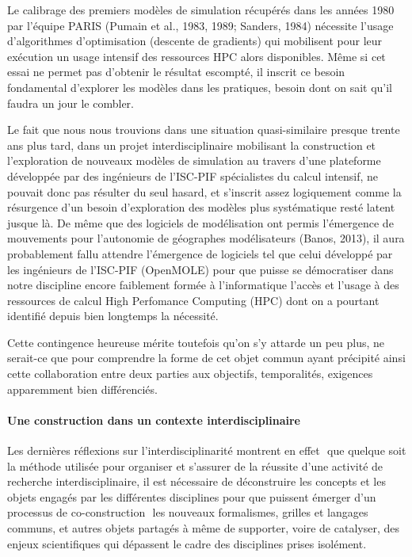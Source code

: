 Le calibrage  des premiers modèles de simulation récupérés dans les années 1980 par l'équipe PARIS (Pumain et al., 1983, 1989; Sanders, 1984)⁠ nécessite l'usage d'algorithmes d'optimisation (descente de gradients) qui mobilisent pour leur exécution un usage intensif des ressources HPC alors disponibles. Même si cet essai ne permet pas d'obtenir le résultat escompté, il inscrit ce besoin fondamental d'explorer les modèles dans les pratiques, besoin dont on sait qu'il faudra un jour le combler. 

Le fait que nous nous trouvions dans une situation quasi-similaire presque trente ans plus tard, dans un projet interdisciplinaire mobilisant la construction et l'exploration de nouveaux modèles de simulation au travers d'une plateforme développée par des ingénieurs de l'ISC-PIF spécialistes du calcul intensif, ne pouvait donc pas résulter du seul hasard, et s'inscrit assez logiquement comme la résurgence d'un besoin d'exploration des modèles plus systématique resté latent jusque là. De même que des logiciels de modélisation ont permis l'émergence de mouvements pour l'autonomie de géographes modélisateurs (Banos, 2013)⁠, il aura probablement fallu attendre l'émergence de logiciels tel que celui développé par les ingénieurs de l'ISC-PIF (OpenMOLE) pour que puisse se démocratiser dans notre discipline encore faiblement formée à l'informatique l'accès et l'usage à des ressources de calcul High Perfomance Computing (HPC) dont on a pourtant identifié depuis bien longtemps la nécessité. 

Cette contingence heureuse mérite toutefois qu'on s'y attarde un peu plus, ne serait-ce que pour comprendre la forme de cet objet commun ayant précipité ainsi cette collaboration entre deux parties aux objectifs, temporalités, exigences apparemment bien différenciés. 

\paragraph*{Une construction dans un contexte interdisciplinaire}

Les dernières réflexions sur l'interdisciplinarité montrent en effet \autocites{Pumain2005, Chapron2014}⁠ que quelque soit la méthode utilisée pour organiser et s'assurer de la réussite d'une activité de recherche interdisciplinaire, il est nécessaire de déconstruire les concepts et les objets engagés par les différentes disciplines pour que puissent émerger d'un processus de co-construction \autocite{Banos2013}⁠ les nouveaux formalismes, grilles et langages communs, et autres objets partagés à même de supporter, voire de catalyser, des enjeux scientifiques qui dépassent le cadre des disciplines prises isolément.

